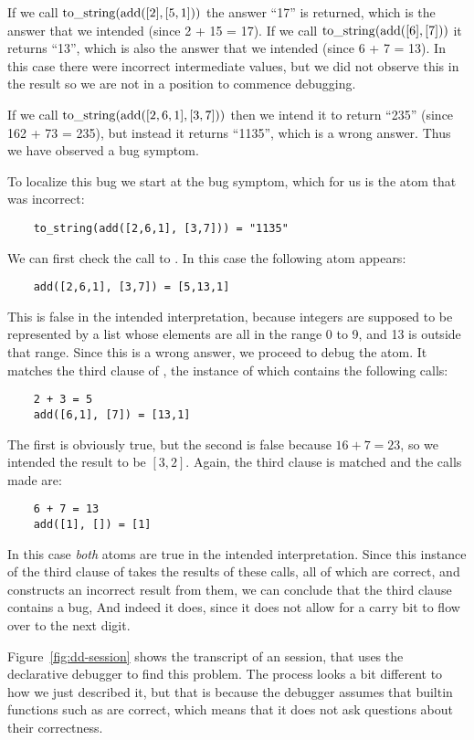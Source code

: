 If we call $\operatorname{to\_string}(\operatorname{add}([2],[5,1]))$
the answer ``17'' is returned,
which is the answer that we intended (since 2 + 15 = 17).
If we call $\operatorname{to\_string}(\operatorname{add}([6],[7]))$
it returns ``13'',
which is also the answer that we intended (since 6 + 7 = 13).
In this case there were incorrect intermediate values,
but we did not observe this in the result
so we are not in a position to commence debugging.

If we call $\operatorname{to\_string}(\operatorname{add}([2,6,1],[3,7]))$
then we intend it to return ``235'' (since 162 + 73 = 235),
but instead it returns ``1135'',
which is a wrong answer.
Thus we have observed a bug symptom.

To localize this bug we start at the bug symptom,
which for us is the atom that was incorrect:
\begin{verbatim}
    to_string(add([2,6,1], [3,7])) = "1135"
\end{verbatim}
We can first check the call to .
In this case the following atom appears:
\begin{verbatim}
    add([2,6,1], [3,7]) = [5,13,1]
\end{verbatim}
This is false in the intended interpretation,
because integers are supposed to be represented
by a list whose elements are all in the range 0 to 9,
and 13 is outside that range.
Since this is a wrong answer, we proceed to debug the atom.
It matches the third clause of ,
the instance of which contains the following calls:
\begin{verbatim}
    2 + 3 = 5
    add([6,1], [7]) = [13,1]
\end{verbatim}
The first is obviously true,
but the second is false because $16 + 7 = 23$,
so we intended the result to be $[3,2]$.
Again, the third clause is matched and the calls made are:
\begin{verbatim}
    6 + 7 = 13
    add([1], []) = [1]
\end{verbatim}
In this case \emph{both} atoms are true in the intended interpretation.
Since this instance of the third clause of 
takes the results of these calls, all of which are correct,
and constructs an incorrect result from them,
we can conclude that the third clause contains a bug,
And indeed it does,
since it does not allow for a carry bit
to flow over to the next digit.

Figure~\ref{fig:dd-session} shows
the transcript of an  session,
that uses the declarative debugger to find this problem.
The process looks a bit different to how we just described it,
but that is because the debugger assumes
that builtin functions such as \co{+} are correct,
which means that it does not ask questions about their correctness.

